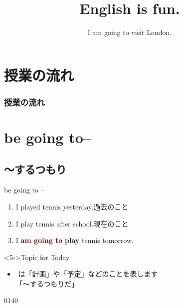 \documentclass[aspectratio=169,xcolor={dvipsnames,table}]{beamer}
\title{English is fun.}
\subtitle{I am going to visit London.}
\author{}
\institute[]{}
\date[]
\newcommand{\myaudio}[1]{\href{#1}{\faVolumeUp}}
\begin{document}
\begin{frame}[plain]
  \titlepage
\end{frame}


\section*{授業の流れ}
\begin{frame}[plain]
  \frametitle{授業の流れ}
  \tableofcontents
\end{frame}



\section{be going to--}

\subsection{〜するつもり}
\begin{frame}[plain]{be going to --}
\Large
\begin{enumerate}
 \item<1-> I played tennis yesterday.\hfill{}{\small 過去のこと}
 \item<2-> I play tennis after school.\hfill{}{\small 現在のこと}
 \item<3-> I \textcolor{Maroon}{\bfseries am going to} {\bfseries play} tennis tomorrow.%
\hfill{}
\end{enumerate}

\vfill

\begin{block}<5->{Topic for Today}
\small
\begin{itemize}[square]
 \item {}\,\,は「計画」や「予定」などのことを表します\\
\hfill{}「～するつもりだ」
\end{itemize}
\end{block}
\hfill{\tiny 0140}\,{\scriptsize \myaudio{./audio/011_be_going_to_01.mp3}}
\end{frame}
\end{document}
